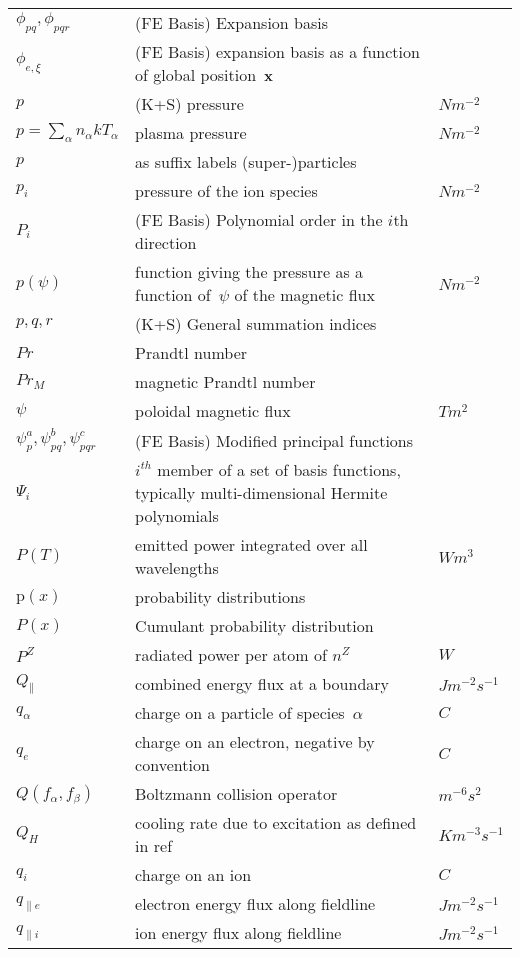\begin{longtable}{|p{3.0cm}|p{10.0cm}|p{3.0cm}|}
$\phi_{pq}, \phi_{pqr}$ &  (FE Basis) Expansion basis & \\
$\phi_{e,\xi}$ & (FE Basis) expansion basis as a function of global position~${\bf x}$ & \\
$p$ & (K+S) pressure  & $N m^{-2}$ \\
$p = \sum_\alpha n_\alpha kT_\alpha$ & plasma pressure  & $N m^{-2}$ \\
$p$ & as suffix labels (super-)particles & \\
$p_i$ & pressure of the ion species  & $N m^{-2}$ \\
$P_i$ &  (FE Basis) Polynomial order in the $i$th direction & \\
$p(\psi)$ & function giving the pressure as a function of~$\psi$ of the magnetic flux  & $N m^{-2}$ \\
$p,q,r$ &  (K+S) General summation indices & \\
$Pr$ & Prandtl number & \\
$Pr_M$ & magnetic Prandtl number & \\
$\psi$ & poloidal magnetic flux  & $T m^2$ \\
$\psi^a_p, \psi^b_{pq}, \psi^c_{pqr}$ &  (FE Basis) Modified principal functions & \\
$\Psi_i$ & $i^{th}$ member of a set of basis functions, typically multi-dimensional Hermite polynomials & \\
$P(T)$ & emitted power integrated over all wavelengths  & $W m^3$ \\
$\mathrm{p}(x)$ & probability distributions    & \\
$P(x)$ & Cumulant probability distribution  & \\
$P^Z$ & radiated power per atom of $n^Z$  & $W$ \\
$Q_\|$ & combined energy flux at a boundary  & $J m^{-2} s^{-1}$ \\
$q_\alpha$ & charge on a particle of species~$\alpha$ & $C$ \\
$q_e$ & charge on an electron, negative by convention & $C$ \\
$Q(f_\alpha, f_\beta)$ & Boltzmann collision operator  & $m^{-6} s^2$ \\
$Q_H$ & cooling rate due to excitation as defined in ref~\cite{Ha13Benc}  & $K m^{-3} s^{-1}$ \\
$q_i$ & charge on an ion  & $C$ \\
$q_{\|e}$ & electron energy flux along fieldline & $J m^{-2} s^{-1}$ \\
$q_{\|i}$ & ion energy flux along fieldline & $J m^{-2} s^{-1}$ \\

\end{longtable}
